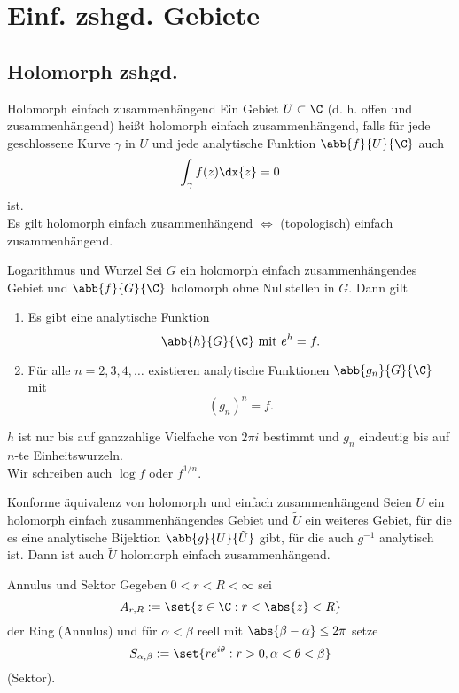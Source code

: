 \section{Einf. zshgd. Gebiete}

\subsection{Holomorph zshgd.}

\begin{karte}{Holomorph einfach zusammenhängend}
    Ein Gebiet \( U \subset \C\) (d. h. offen und zusammenhängend) heißt 
    holomorph einfach zusammenhängend, falls für jede geschlossene Kurve \(\gamma\)
    in \(U\) und jede analytische Funktion \(\abb{f}{U}{\C}\) auch 
    \[ \int_\gamma f(z) \dx{z} = 0 \]
    ist.\\
    Es gilt 
    holomorph einfach zusammenhängend \(\Leftrightarrow\) (topologisch) einfach zusammenhängend.
\end{karte}

\begin{karte}{Logarithmus und Wurzel}
    Sei \(G\) ein holomorph einfach zusammenhängendes Gebiet und \(\abb{f}{G}{\C}\) 
    holomorph ohne Nullstellen in \(G\). Dann gilt
    \begin{enumerate}
        \item Es gibt eine analytische Funktion 
        \[ \abb{h}{G}{\C} \text{ mit } e^h = f. \]
        \item Für alle \(n = 2,3,4,\ldots \) existieren analytische Funktionen 
        \(\abb{g_n}{G}{\C}\) mit 
        \[ (g_n)^n = f. \]
    \end{enumerate}
    \(h\) ist nur bis auf ganzzahlige Vielfache von \(2\pi i\) bestimmt und \(g_n\) eindeutig 
    bis auf \(n\)-te Einheitswurzeln.\\
    Wir schreiben auch \(\log f\) oder \(f^{1/n}\).
\end{karte}

\begin{karte}{Konforme äquivalenz von holomorph und einfach zusammenhängend}
    Seien \(U\) ein holomorph einfach zusammenhängendes Gebiet und 
    \(\tilde{U}\) ein weiteres Gebiet, für die es eine analytische Bijektion 
    \(\abb{g}{U}{\tilde{U}}\) gibt, für die auch \(g^{-1}\) analytisch ist. 
    Dann ist auch \(\tilde{U}\) holomorph einfach zusammenhängend.
\end{karte}

\begin{karte}{Annulus und Sektor}
    Gegeben \(0 < r < R < \infty\) sei 
    \[ A_{r,R} := \set{ z\in \C : r < \abs{z} < R } \]
    der Ring (Annulus) und für \(\alpha < \beta\) reell mit \(\abs{\beta - \alpha} \leq 2 \pi\) setze 
    \[ S_{\alpha, \beta} := \set{r e^{i\theta}: r > 0, \alpha < \theta < \beta} \]
    (Sektor).
\end{karte}

